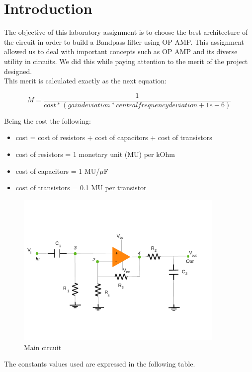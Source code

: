 \newpage
\section{Introduction}
\label{sec:introduction}

The objective of this laboratory assignment is to choose the best architecture of the circuit in order to build a Bandpass filter using OP AMP. This assignment allowed us to deal with important concepts such as OP AMP and its diverse utility in circuits. We did this while paying attention to the merit of the project designed.\\
This merit is calculated exactly as the next equation:

\begin{equation} 
M = \frac{1}{cost * (gain deviation * central frequency deviation + 1e-6)}
\label{eq1}
\end{equation}

Being the cost the following:
\begin{itemize}
	\item cost = cost of resistors  + cost of capacitors + cost of transistors
	\item cost of resistors = 1 monetary unit (MU) per kOhm
	\item cost of capacitors = 1 MU/$\mu$F
	\item cost of transistors = 0.1 MU per transistor
	
\end{itemize}

\begin{figure}[H] 
\centering
\includegraphics[width= 10cm]{circuito5.pdf} 
\caption{Main circuit}
\label{first}
\end{figure}

The constants values used are expressed in the following table.

